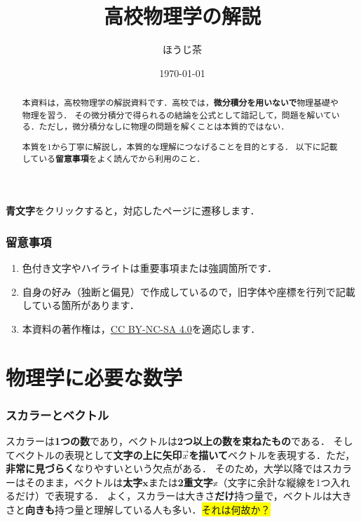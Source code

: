 \documentclass[a4paper,11pt]{ltjsarticle}
\title{高校物理学の解説}
\author{ほうじ茶}
\date{\today}
\begin{document}
\maketitle

\begin{abstract}
  本資料は，高校物理学の解説資料です．高校では，\textbf{微分積分を用いないで}物理基礎や物理を習う．
  その微分積分で得られるの結論を公式として諳記して，問題を解いている．ただし，微分積分なしに物理の問題を解くことは本質的ではない．
  
  本質を1から丁寧に解説し，本質的な理解につなげることを目的とする．
  以下に記載している\textbf{留意事項}をよく読んでから利用のこと．
\end{abstract}

\tableofcontents

\vspace{12pt}

\begin{center}
  \textbf{\color{blue}青文字}をクリックすると，対応したページに遷移します．
\end{center}

\section*{留意事項}

\begin{enumerate}
  \item 色付き文字やハイライトは重要事項または強調箇所です．
  \item 自身の好み（独断と偏見）で作成しているので，旧字体や座標を行列で記載している箇所があります．
  \item 本資料の著作権は，\href{https://creativecommons.org/licenses/by-nc-sa/4.0}{CC BY-NC-SA 4.0}を適応します．
\end{enumerate}

\clearpage

\part{物理学に必要な数学}

\section{スカラーとベクトル}

スカラーは\textbf{1つの数}であり，ベクトルは\textbf{2つ以上の数を束ねたもの}である．
そしてベクトルの表現として\textbf{文字の上に矢印$\vec{x}$を描いて}ベクトルを表現する．ただ，\textbf{非常に見づらく}なりやすいという欠点がある．
そのため，大学以降ではスカラーはそのまま，ベクトルは\textbf{太字}$\bm{x}$または\textbf{2重文字}$\mathbb{x}$（文字に余計な縦線を1つ入れるだけ）で表現する．
よく，スカラーは大きさ\textbf{だけ}持つ量で，ベクトルは大きさと\textbf{向きも}持つ量と理解している人も多い．\colorbox{yellow}{それは何故か？}
\end{document}
